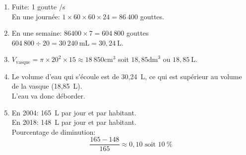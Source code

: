 
\medskip

\begin{enumerate}[itemsep=1em]
\item
  Fuite: 1 goutte /s\\
  En une journée: $1\times 60\times 60\times{24 = 86~400}$ gouttes.
\item
  En une semaine: $86400\times{7 = 604~800}$ gouttes\\
  $604~800\div 20 = 30~240~\text{mL} = 30,24~\text{L}$.
\item
  $V_{\text{vasque}} = \pi\times 20^{2}\times 15\approx 18~850 \text{cm}^{3}$ soit $ 18,85 \text{dm}^{3}$ ou $18,85~\text{L}$.
\item
  Le volume d'eau qui s'écoule est de 30,24~L, ce qui est supérieur au
  volume de la vasque (18,85~L).\\
  L'eau va donc déborder.
\item
  En 2004: 165~L par jour et par habitant.\\
  En 2018: 148~L par jour et par habitant.\\
  Pourcentage de diminution:
  \[\frac{165-148}{165} \approx 0,10  \text{ soit } 10~\text{\%}\]
\end{enumerate}





